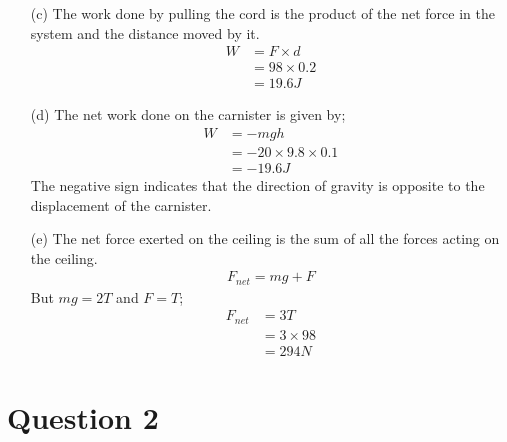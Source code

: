 \documentclass[12pt,a4paper]{article}
\begin{document}
\begin{itemize}
\item[(c)]
The work done by pulling the cord is the product of the net force in the system and the distance moved by it.\\
\begin{align*}
W&=F\times d\\
&=98\times 0.2\\
&=19.6J
\end{align*}
\item[(d)]
The net work done on the carnister is given by;
\begin{align*}
W&=-mgh\\
&=-20\times9.8\times0.1\\
&=-19.6J
\end{align*}
The negative sign indicates that the direction of gravity is opposite to the displacement of the carnister.
\item[(e)]
The net force exerted on the ceiling is the sum of all the forces acting on the ceiling.\\
\begin{align}
F_{net}=mg+F
\end{align}
But $mg=2T$ and $F=T$; 
\begin{align*}
F_{net}&=3T\\
&=3\times98\\
&=294N
\end{align*}
\end{itemize}
\newpage

\section*{Question 2}
\end{document}
